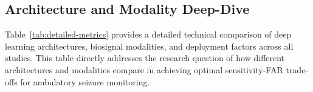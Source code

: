 \subsection{Architecture and Modality Deep-Dive}

Table~\ref{tab:detailed-metrics} provides a detailed technical comparison of deep learning architectures, biosignal modalities, and deployment factors across all studies. This table directly addresses the research question of how different architectures and modalities compare in achieving optimal sensitivity-FAR trade-offs for ambulatory seizure monitoring.

\begin{landscape}
\begin{table}[htbp]
\centering
\small
\caption{Architecture and Modality Deep-Dive: Technical Dimensions Across Studies}
\label{tab:detailed-metrics}
\setlength{\tabcolsep}{3.5pt}
\renewcommand{\arraystretch}{1.1}
\end{table}
\end{landscape}
